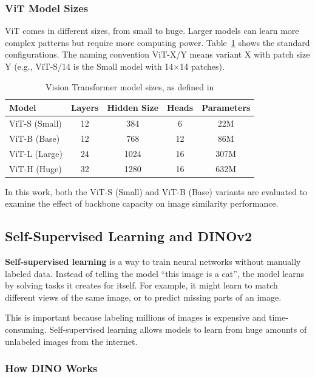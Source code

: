\documentclass[
    english,
]{VUMIFPSbakalaurinis}
\begin{document}
\subsubsection{ViT Model Sizes}

ViT comes in different sizes, from small to huge. Larger models can learn more complex patterns but require more computing power. Table~\ref{tab:vit_variants} shows the standard configurations. The naming convention ViT-X/Y means variant X with patch size Y (e.g., ViT-S/14 is the Small model with 14$\times$14 patches).

\begin{table}[H]
\centering
\caption{Vision Transformer model sizes, as defined in \cite{Dos21}}
\label{tab:vit_variants}
\begin{tabular}{lcccc}
\toprule
\textbf{Model} & \textbf{Layers} & \textbf{Hidden Size} & \textbf{Heads} & \textbf{Parameters} \\
\midrule
ViT-S (Small) & 12 & 384 & 6 & 22M \\
ViT-B (Base) & 12 & 768 & 12 & 86M \\
ViT-L (Large) & 24 & 1024 & 16 & 307M \\
ViT-H (Huge) & 32 & 1280 & 16 & 632M \\
\bottomrule
\end{tabular}
\end{table}

In this work, both the ViT-S (Small) and ViT-B (Base) variants are evaluated to examine the effect of backbone capacity on image similarity performance.

\subsection{Self-Supervised Learning and DINOv2}

\textbf{Self-supervised learning} is a way to train neural networks without manually labeled data. Instead of telling the model \enquote{this image is a cat}, the model learns by solving tasks it creates for itself. For example, it might learn to match different views of the same image, or to predict missing parts of an image.

This is important because labeling millions of images is expensive and time-consuming. Self-supervised learning allows models to learn from huge amounts of unlabeled images from the internet.

\subsubsection{How DINO Works}
\end{document}
